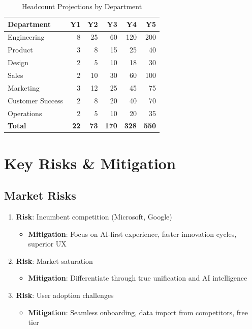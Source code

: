 \begin{table}[H]
\centering
\caption{Headcount Projections by Department}
\begin{tabular}{|l|r|r|r|r|r|}
\hline
\rowcolor{lightgray}
\textbf{Department} & \textbf{Y1} & \textbf{Y2} & \textbf{Y3} & \textbf{Y4} & \textbf{Y5} \\
\hline
Engineering & 8 & 25 & 60 & 120 & 200 \\
\hline
Product & 3 & 8 & 15 & 25 & 40 \\
\hline
Design & 2 & 5 & 10 & 18 & 30 \\
\hline
Sales & 2 & 10 & 30 & 60 & 100 \\
\hline
Marketing & 3 & 12 & 25 & 45 & 75 \\
\hline
Customer Success & 2 & 8 & 20 & 40 & 70 \\
\hline
Operations & 2 & 5 & 10 & 20 & 35 \\
\hline
\textbf{Total} & \textbf{22} & \textbf{73} & \textbf{170} & \textbf{328} & \textbf{550} \\
\hline
\end{tabular}
\end{table}

\section{Key Risks \& Mitigation}

\subsection{Market Risks}

\begin{enumerate}
    \item \textbf{Risk}: Incumbent competition (Microsoft, Google)
    \begin{itemize}
        \item \textbf{Mitigation}: Focus on AI-first experience, faster innovation cycles, superior UX
    \end{itemize}
    
    \item \textbf{Risk}: Market saturation
    \begin{itemize}
        \item \textbf{Mitigation}: Differentiate through true unification and AI intelligence
    \end{itemize}
    
    \item \textbf{Risk}: User adoption challenges
    \begin{itemize}
        \item \textbf{Mitigation}: Seamless onboarding, data import from competitors, free tier
    \end{itemize}
\end{enumerate}

